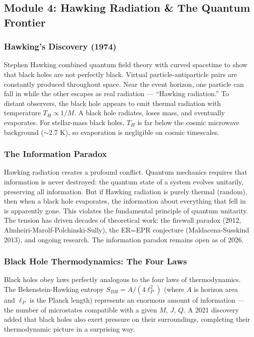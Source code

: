 \documentclass[11pt,letterpaper]{article}
\begin{document}
\subsection{Module 4: Hawking Radiation \& The Quantum Frontier}

\subsubsection{Hawking's Discovery (1974)}

Stephen Hawking combined quantum field theory with curved spacetime to show that black holes are not perfectly black. Virtual particle-antiparticle pairs are constantly produced throughout space. Near the event horizon, one particle can fall in while the other escapes as real radiation --- ``Hawking radiation.'' To distant observers, the black hole appears to emit thermal radiation with temperature $T_H \propto 1/M$. A black hole radiates, loses mass, and eventually evaporates. For stellar-mass black holes, $T_H$ is far below the cosmic microwave background ($\sim 2.7$ K), so evaporation is negligible on cosmic timescales.

\subsubsection{The Information Paradox}

Hawking radiation creates a profound conflict. Quantum mechanics requires that information is never destroyed: the quantum state of a system evolves unitarily, preserving all information. But if Hawking radiation is purely thermal (random), then when a black hole evaporates, the information about everything that fell in is apparently gone. This violates the fundamental principle of quantum unitarity. The tension has driven decades of theoretical work: the firewall paradox (2012, Almheiri-Marolf-Polchinski-Sully), the ER=EPR conjecture (Maldacena-Susskind 2013), and ongoing research. The information paradox remains open as of 2026.

\subsubsection{Black Hole Thermodynamics: The Four Laws}

Black holes obey laws perfectly analogous to the four laws of thermodynamics. The Bekenstein-Hawking entropy $S_{BH} = A/(4\ell_P^2)$ (where $A$ is horizon area and $\ell_P$ is the Planck length) represents an enormous amount of information --- the number of microstates compatible with a given $M$, $J$, $Q$. A 2021 discovery added that black holes also exert pressure on their surroundings, completing their thermodynamic picture in a surprising way.
\end{document}
